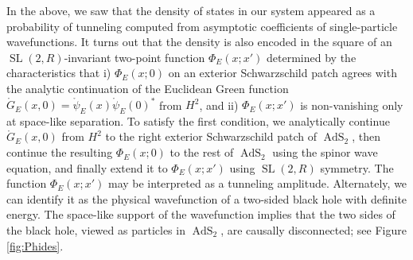 \documentclass[11pt]{article}
\newcommand{\RR}{\mathbb{R}}
\DeclareMathOperator{\tSL}{\widetilde{\mathrm{SL}}}
\DeclareMathOperator{\tAdS}{\widetilde{AdS}}
\DeclareMathOperator{\HH}{H}
\def\widetilde#1{#1}%
\def\HH{H}
\def\RR{R}
\begin{document}
In the above, we saw that the density of states in our system appeared as a probability of tunneling computed from asymptotic coefficients of single-particle wavefunctions. It turns out that the density is also encoded in the square of an $\tSL(2,\RR)$-invariant two-point function $\Phi_E(x;x')$ determined by the characteristics that i) $\Phi_E(x;0)$ on an exterior Schwarzschild patch agrees with the analytic continuation of the Euclidean Green function $\mathring{G}_E(x, 0)=\mathring{\psi}_E(x)\mathring{\psi}_E(0)^*$ from $\HH^2$, and ii) $\Phi_E(x;x')$ is non-vanishing only at space-like separation. To satisfy the first condition, we analytically continue $\mathring{G}_{E}(x,0)$ from $\HH^2$ to the right exterior Schwarzschild patch of $\tAdS_2$, then continue the resulting $\Phi_E(x;0)$ to the rest of $\tAdS_2$ using the spinor wave equation, and finally extend it to $\Phi_E(x;x')$ using $\tSL(2,\RR)$ symmetry. The function $\Phi_E(x;x')$ may be interpreted as a tunneling amplitude. Alternately, we can identify it as the physical wavefunction of a two-sided black hole with definite energy. The space-like support of the wavefunction implies that the two sides of the black hole, viewed as particles in $\tAdS_2$, are causally disconnected; see Figure \ref{fig:Phides}.
\end{document}
